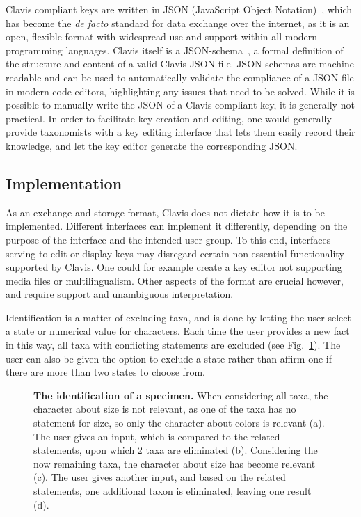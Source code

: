 \documentclass[10pt,letterpaper]{article}
\begin{document}
Clavis compliant keys are written in JSON (JavaScript Object Notation)~\cite{JSON}, which has become the \textit{de facto} standard for data exchange over the internet, as it is an open, flexible format with widespread use and support within all modern programming languages. Clavis itself is a JSON-schema~\cite{JSON_schema}, a formal definition of the structure and content of a valid Clavis JSON file. JSON-schemas are machine readable and can be used to automatically validate the compliance of a JSON file in modern code editors, highlighting any issues that need to be solved. While it is possible to manually write the JSON of a Clavis-compliant key, it is generally not practical. In order to facilitate key creation and editing, one would generally provide taxonomists with a key editing interface that lets them easily record their knowledge, and let the key editor generate the corresponding JSON.
\subsection*{
Implementation
}
As an exchange and storage format, Clavis does not dictate how it is to be implemented. Different interfaces can implement it differently, depending on the purpose of the interface and the intended user group. To this end, interfaces serving to edit or display keys may disregard certain non-essential functionality supported by Clavis. One could for example create a key editor not supporting media files or multilingualism. Other aspects of the format are crucial however, and require support and unambiguous interpretation.

Identification is a matter of excluding taxa, and is done by letting the user select a state or numerical value for characters. Each time the user provides a new fact in this way, all taxa with conflicting statements are excluded (see Fig.~\ref{fig2}). The user can also be given the option to exclude a state rather than affirm one if there are more than two states to choose from. 


\begin{figure}[!h]
  \caption{{\bf The identification of a specimen.}
  When considering all taxa, the character about size is not relevant, as one of the taxa has no statement for size, so only the character about colors is relevant (a). The user gives an input, which is compared to the related statements, upon which 2 taxa are eliminated (b). Considering the now remaining taxa, the character about size has become relevant (c). The user gives another input, and based on the related statements, one additional taxon is eliminated, leaving one result (d).
  }
  \label{fig2}
 \end{figure}
\end{document}
